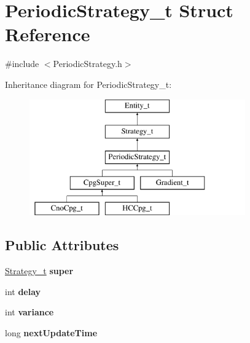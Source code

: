 \hypertarget{structPeriodicStrategy__t}{
\section{PeriodicStrategy\_\-t Struct Reference}
\label{structPeriodicStrategy__t}
}


{\ttfamily \#include $<$PeriodicStrategy.h$>$}

Inheritance diagram for PeriodicStrategy\_\-t:\begin{figure}[H]
\begin{center}
\leavevmode
\includegraphics[height=5.000000cm]{structPeriodicStrategy__t}
\end{center}
\end{figure}
\subsection*{Public Attributes}
\begin{DoxyCompactItemize}
\item 
\hypertarget{structPeriodicStrategy__t_a24d21b615e8611bd8267b8bbc7c9f88c}{
\hyperlink{structStrategy__t}{Strategy\_\-t} {\bfseries super}}
\label{structPeriodicStrategy__t_a24d21b615e8611bd8267b8bbc7c9f88c}

\item 
\hypertarget{structPeriodicStrategy__t_a0f058a838a49754bc4d437c33e232399}{
int {\bfseries delay}}
\label{structPeriodicStrategy__t_a0f058a838a49754bc4d437c33e232399}

\item 
\hypertarget{structPeriodicStrategy__t_a749026afc6f19a4a3a30fb7fa8155eaf}{
int {\bfseries variance}}
\label{structPeriodicStrategy__t_a749026afc6f19a4a3a30fb7fa8155eaf}

\item 
\hypertarget{structPeriodicStrategy__t_a0158f19fb85c628ca5d61785068916e9}{
long {\bfseries nextUpdateTime}}
\label{structPeriodicStrategy__t_a0158f19fb85c628ca5d61785068916e9}

\end{DoxyCompactItemize}


